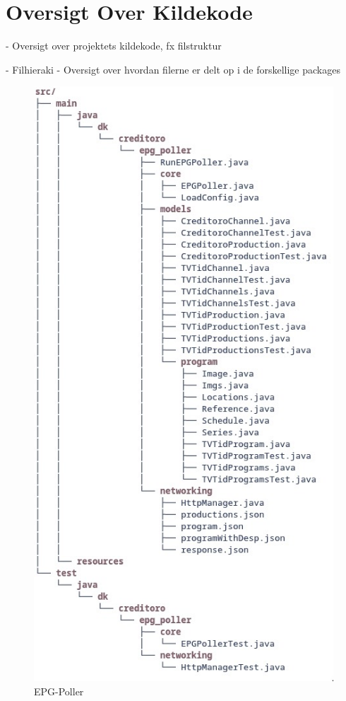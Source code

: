 \section{Oversigt Over Kildekode}
- Oversigt over projektets kildekode, fx filstruktur

- Filhieraki
- Oversigt over hvordan filerne er delt op i de forskellige packages 

\begin{figure}[H]
\centering
\includegraphics[scale=0.6]{appendices/unknown_white.jpg}
\caption{EPG-Poller}
\label{fig:EPG}
\end{figure}



